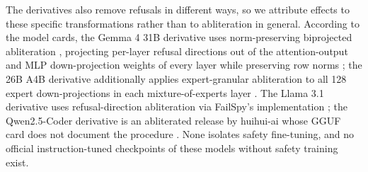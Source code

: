 The derivatives also remove refusals in different ways, so we attribute
effects to these specific transformations rather than to abliteration in
general. According to the model cards, the Gemma 4 31B derivative uses
norm-preserving biprojected abliteration \cite{grimjim2025normpreserving},
projecting per-layer refusal directions out of the attention-output and MLP
down-projection weights of every layer while preserving row norms
\cite{trevorjs_gemma4_31b_uncensored}; the 26B A4B derivative additionally
applies expert-granular abliteration to all 128 expert down-projections in each
mixture-of-experts layer \cite{trevorjs_gemma4_26b_uncensored}. The Llama 3.1
derivative uses refusal-direction abliteration \cite{arditi2024refusal} via
FailSpy's implementation \cite{mlabonne_llama31_8b_abliterated}; the
Qwen2.5-Coder derivative is an abliterated release by huihui-ai whose GGUF card
does not document the procedure \cite{qwen25coder7b_abliterated_gguf}. None
isolates safety fine-tuning, and no official instruction-tuned checkpoints of
these models without safety training exist.
